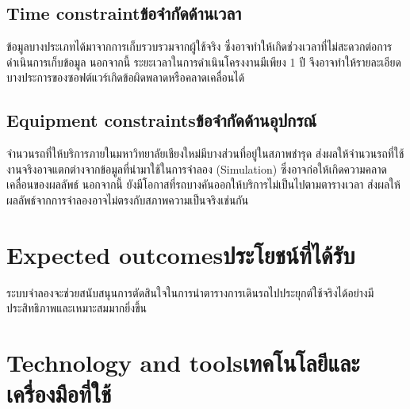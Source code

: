 \subsection{\ifenglish Time constraint\else ข้อจำกัดด้านเวลา\fi}
    \begin{mypara}
        \indent ข้อมูลบางประเภทได้มาจากการเก็บรวบรวมจากผู้ใช้จริง ซึ่งอาจทำให้เกิดช่วงเวลาที่ไม่สะดวกต่อการดำเนินการเก็บข้อมูล 
        นอกจากนี้ ระยะเวลาในการดำเนินโครงงานมีเพียง 1 ปี จึงอาจทำให้รายละเอียดบางประการของซอฟต์แวร์เกิดข้อผิดพลาดหรือคลาดเคลื่อนได้
    \end{mypara}
\subsection{\ifenglish Equipment constraints\else ข้อจำกัดด้านอุปกรณ์\fi}
    \begin{mypara}
        \indent จำนวนรถที่ให้บริการภายในมหาวิทยาลัยเชียงใหม่มีบางส่วนที่อยู่ในสภาพชำรุด 
        ส่งผลให้จำนวนรถที่ใช้งานจริงอาจแตกต่างจากข้อมูลที่นำมาใช้ในการจำลอง (Simulation) 
        ซึ่งอาจก่อให้เกิดความคลาดเคลื่อนของผลลัพธ์ นอกจากนี้ ยังมีโอกาสที่รถบางคันออกให้บริการไม่เป็นไปตามตารางเวลา 
        ส่งผลให้ผลลัพธ์จากการจำลองอาจไม่ตรงกับสภาพความเป็นจริงเช่นกัน
    \end{mypara}

\section{\ifenglish Expected outcomes\else ประโยชน์ที่ได้รับ\fi}
    \begin{mypara}
        \indent ระบบจำลองจะช่วยสนับสนุนการตัดสินใจในการนำตารางการเดินรถไปประยุกต์ใช้จริงได้อย่างมีประสิทธิภาพและเหมาะสมมากยิ่งขึ้น
    \end{mypara}
\section{\ifenglish Technology and tools\else เทคโนโลยีและเครื่องมือที่ใช้\fi}

